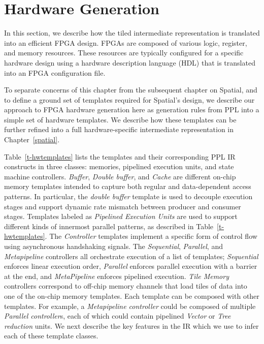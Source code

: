 \section{Hardware Generation}
\label{hardware}

In this section, we describe how the tiled intermediate representation is
translated into an efficient FPGA design. FPGAs are composed of various logic,
register, and memory resources. These resources are typically configured for
a specific hardware design using a hardware description language (HDL)
that is translated into an FPGA configuration file.

To separate concerns of this chapter from the subsequent chapter on Spatial,
and to define a ground set of templates required for Spatial's design,
we describe our approach to FPGA hardware generation here as generation rules
from PPL into a simple set of hardware templates. We describe how
these templates can be further refined
into a full hardware-specific intermediate representation in Chapter~\ref{spatial}.



Table~\ref{t-hwtemplates} lists the templates and their corresponding PPL IR
constructs in three classes: memories, pipelined execution units,
and state machine controllers. \emph{Buffer}, \emph{Double buffer},
and \emph{Cache} are different on-chip memory templates intended to capture both
regular and data-dependent access patterns. In particular, the \emph{double buffer} template
is used to decouple execution stages and support dynamic rate mismatch between producer and consumer stages. Templates labeled as
\emph{Pipelined Execution Units} are used to support different kinds of innermost parallel patterns, as described in Table~\ref{t-hwtemplates}.
The \emph{Controller} templates implement a specific form of control flow using asynchronous handshaking signals. The \emph{Sequential},
\emph{Parallel}, and \emph{Metapipeline} controllers all orchestrate execution of a list of templates; \emph{Sequential} enforces
linear execution order, \emph{Parallel} enforces parallel execution with a barrier at the end, and \emph{MetaPipeline} enforces
pipelined execution. \emph{Tile Memory} controllers correspond to off-chip memory channels that load tiles of data into
one of the on-chip memory templates.
Each template can be composed with other templates.
For example, a \emph{Metapipeline controller} could be composed of multiple \emph{Parallel controller}s, each of which could
contain pipelined \emph{Vector} or \emph{Tree reduction} units.
We next describe the key features in the IR which we use to infer each of these template classes.



